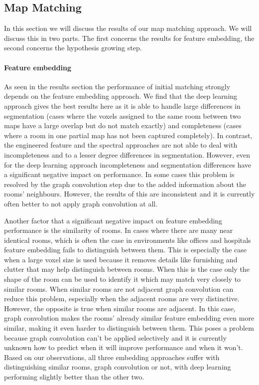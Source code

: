 
\subsection{Map Matching}
In this section we will discuss the results of our map matching approach. We will discuss this in two parts. The first concerns the results for feature embedding, the second concerns the hypothesis growing step. 

\paragraph{Feature embedding}
As seen in the results section the performance of initial matching strongly depends on the feature embedding approach. We find that the deep learning approach gives the best results here as it is able to handle large differences in segmentation (cases where the voxels assigned to the same room between two maps have a large overlap but do not match exactly) and completeness (cases where a room in one partial map has not been captured completely). In contrast, the engineered feature and the spectral approaches are not able to deal with incompleteness and to a lesser degree differences in segmentation. However, even for the deep learning approach incompleteness and segmentation differences have a significant negative impact on performance. In some cases this problem is resolved by the graph convolution step due to the added information about the rooms' neighbours. However, the results of this are inconsistent and it is currently often better to not apply graph convolution at all. 

Another factor that a significant negative impact on feature embedding performance is the similarity of rooms. In cases where there are many near identical rooms, which is often the case in environments like offices and hospitals feature embedding fails to distinguish between them. This is especially the case when a large voxel size is used because it removes details like furnishing and clutter that may help distinguish between rooms. When this is the case only the shape of the room can be used to identify it which may match very closely to similar rooms. When similar rooms are not adjacent graph convolution can reduce this problem, especially when the adjacent rooms are very distinctive. However, the opposite is true when similar rooms are adjacent. In this case, graph convolution makes the rooms' already similar feature embedding even more similar, making it even harder to distinguish between them. This poses a problem because graph convolution can't be applied selectively and it is currently unknown how to predict when it will improve performance and when it won't. Based on our observations, all three embedding approaches suffer with distinguishing similar rooms, graph convolution or not, with deep learning performing slightly better than the other two.

